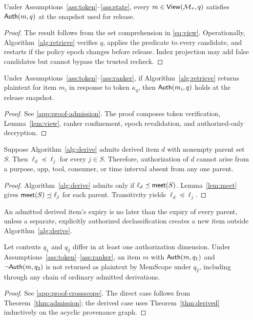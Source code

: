 \begin{lemma}
\label{lem:view}
Under Assumptions~\ref{ass:token}--\ref{ass:state}, every $m\in\mathsf{View}(\mathcal{M}_\tau,q)$ satisfies $\mathsf{Auth}(m,q)$ at the snapshot used for release.
\end{lemma}
\begin{proof}
The result follows from the set comprehension in \cref{eq:view}. Operationally, Algorithm~\ref{alg:retrieve} verifies $q$, applies the predicate to every candidate, and restarts if the policy epoch changes before release. Index projection may add false candidates but cannot bypass the trusted recheck.
\end{proof}

\begin{theorem}
\label{thm:admission}
Under Assumptions~\ref{ass:token}--\ref{ass:ranker}, if Algorithm~\ref{alg:retrieve} returns plaintext for item $m_i$ in response to token $\kappa_q$, then $\mathsf{Auth}(m_i,q)$ holds at the release snapshot.
\end{theorem}
\begin{proof}
See \cref{app:proof-admission}. The proof composes token verification, Lemma~\ref{lem:view}, ranker confinement, epoch revalidation, and authorized-only decryption.
\end{proof}

\begin{theorem}
\label{thm:derived}
Suppose Algorithm~\ref{alg:derive} admits derived item $d$ with nonempty parent set $S$. Then $\ell_d\preceq\ell_j$ for every $j\in S$. Therefore, authorization of $d$ cannot arise from a purpose, app, tool, consumer, or time interval absent from any one parent.
\end{theorem}
\begin{proof}
Algorithm~\ref{alg:derive} admits only if $\ell_d\preceq\mathsf{meet}(S)$. Lemma~\ref{lem:meet} gives $\mathsf{meet}(S)\preceq\ell_j$ for each parent. Transitivity yields $\ell_d\preceq\ell_j$.
\end{proof}

\begin{corollary}
\label{cor:expiry-inherit}
An admitted derived item's expiry is no later than the expiry of every parent, unless a separate, explicitly authorized declassification creates a new item outside Algorithm~\ref{alg:derive}.
\end{corollary}

\begin{theorem}
\label{thm:crossscope}
Let contexts $q_1$ and $q_2$ differ in at least one authorization dimension. Under Assumptions~\ref{ass:token}--\ref{ass:ranker}, an item $m$ with $\mathsf{Auth}(m,q_1)$ and $\neg\mathsf{Auth}(m,q_2)$ is not returned as plaintext by MemScope under $q_2$, including through any chain of ordinary admitted derivations.
\end{theorem}
\begin{proof}
See \cref{app:proof-crossscope}. The direct case follows from Theorem~\ref{thm:admission}; the derived case uses Theorem~\ref{thm:derived} inductively on the acyclic provenance graph.
\end{proof}

